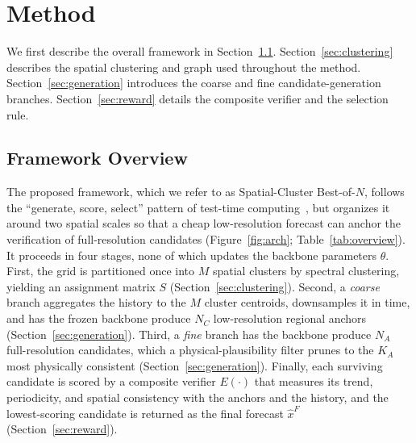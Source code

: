 \documentclass[preprint,12pt]{elsarticle}
\begin{document}
\section{Method}
\label{sec:method}
We first describe the overall framework in Section~\ref{sec:overview}. Section~\ref{sec:clustering} describes the spatial clustering and graph used throughout the method. Section~\ref{sec:generation} introduces the coarse and fine candidate-generation branches. Section~\ref{sec:reward} details the composite verifier and the selection rule.

\subsection{Framework Overview}
\label{sec:overview}

The proposed framework, which we refer to as Spatial-Cluster Best-of-$N$, follows the ``generate, score, select'' pattern of test-time computing~\citep{snell2024scaling}, but organizes it around two spatial scales so that a cheap low-resolution forecast can anchor the verification of full-resolution candidates (Figure~\ref{fig:arch}; Table~\ref{tab:overview}). It proceeds in four stages, none of which updates the backbone parameters $\theta$. First, the grid is partitioned once into $M$ spatial clusters by spectral clustering, yielding an assignment matrix $S$ (Section~\ref{sec:clustering}). Second, a \emph{coarse} branch aggregates the history to the $M$ cluster centroids, downsamples it in time, and has the frozen backbone produce $N_C$ low-resolution regional anchors (Section~\ref{sec:generation}). Third, a \emph{fine} branch has the backbone produce $N_A$ full-resolution candidates, which a physical-plausibility filter prunes to the $K_A$ most physically consistent (Section~\ref{sec:generation}). Finally, each surviving candidate is scored by a composite verifier $E(\cdot)$ that measures its trend, periodicity, and spatial consistency with the anchors and the history, and the lowest-scoring candidate is returned as the final forecast $\hat{x}^F$ (Section~\ref{sec:reward}).
\end{document}
